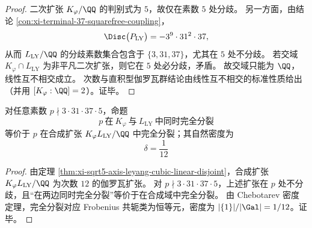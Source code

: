 \begin{proof}
二次扩张 \(K_\varphi/\QQ\) 的判别式为 \(5\)，故仅在素数 \(5\) 处分歧。
另一方面，由结论 \ref{con:xi-terminal-37-squarefree-coupling}，
\[
\Disc\bigl(P_{\mathrm{LY}}\bigr)=-3^9\cdot 31^2\cdot 37,
\]
从而 \(L_{\mathrm{LY}}/\QQ\) 的分歧素数集合包含于 \(\{3,31,37\}\)，尤其在 \(5\) 处不分歧。
若交域 \(K_\varphi\cap L_{\mathrm{LY}}\) 为非平凡二次扩张，则它在 \(5\) 处必分歧，矛盾。
故交域只能为 \(\QQ\)，线性互不相交成立。
次数与直积型伽罗瓦群结论由线性互不相交的标准性质给出（并用 \([K_\varphi:\QQ]=2\)）。证毕。
\end{proof}

\begin{corollary}\label{cor:xi-sqrt5-leyang-double-split-density-1-12}
对任意素数 \(p\nmid 3\cdot 31\cdot 37\cdot 5\)，命题
\[
p\ \text{在}\ K_\varphi\ \text{与}\ L_{\mathrm{LY}}\ \text{中同时完全分裂}
\]
等价于 \(p\) 在合成扩张 \(K_\varphi L_{\mathrm{LY}}/\QQ\) 中完全分裂；其自然密度为
\[
\boxed{\;\delta=\frac{1}{12}\;}
\]
\end{corollary}

\begin{proof}
由定理 \ref{thm:xi-sqrt5-axis-leyang-cubic-linear-disjoint}，合成扩张 \(K_\varphi L_{\mathrm{LY}}/\QQ\) 为次数 \(12\) 的伽罗瓦扩张。
对 \(p\nmid 3\cdot 31\cdot 37\cdot 5\)，上述扩张在 \(p\) 处不分歧，且“在两边同时完全分裂”等价于在合成域中完全分裂。
由 Chebotarev 密度定理，完全分裂对应 Frobenius 共轭类为恒等元，密度为 \(|\{1\}|/|\Gal|=1/12\)。证毕。
\end{proof}

